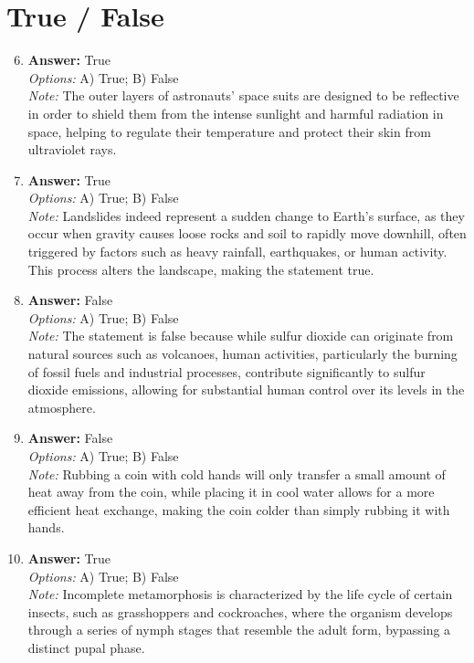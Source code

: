 \documentclass[12pt]{article}
\begin{document}
\section*{True / False}
\begin{enumerate}[label=\arabic*.]
\setcounter{enumi}{5}
\item \textbf{Answer:} True
\\ \textit{Options:} A) True; B) False
\\ \textit{Note:} The outer layers of astronauts' space suits are designed to be reflective in order to shield them from the intense sunlight and harmful radiation in space, helping to regulate their temperature and protect their skin from ultraviolet rays.
\item \textbf{Answer:} True
\\ \textit{Options:} A) True; B) False
\\ \textit{Note:} Landslides indeed represent a sudden change to Earth's surface, as they occur when gravity causes loose rocks and soil to rapidly move downhill, often triggered by factors such as heavy rainfall, earthquakes, or human activity. This process alters the landscape, making the statement true.
\item \textbf{Answer:} False
\\ \textit{Options:} A) True; B) False
\\ \textit{Note:} The statement is false because while sulfur dioxide can originate from natural sources such as volcanoes, human activities, particularly the burning of fossil fuels and industrial processes, contribute significantly to sulfur dioxide emissions, allowing for substantial human control over its levels in the atmosphere.
\item \textbf{Answer:} False
\\ \textit{Options:} A) True; B) False
\\ \textit{Note:} Rubbing a coin with cold hands will only transfer a small amount of heat away from the coin, while placing it in cool water allows for a more efficient heat exchange, making the coin colder than simply rubbing it with hands.
\item \textbf{Answer:} True
\\ \textit{Options:} A) True; B) False
\\ \textit{Note:} Incomplete metamorphosis is characterized by the life cycle of certain insects, such as grasshoppers and cockroaches, where the organism develops through a series of nymph stages that resemble the adult form, bypassing a distinct pupal phase.
\end{enumerate}
\end{document}
